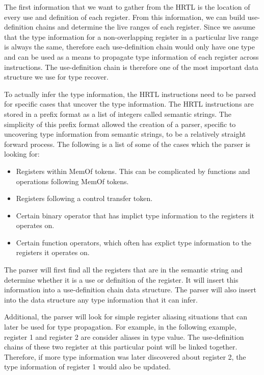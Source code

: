 The first information that we want to gather from the HRTL is the location
of every use and definition of each register. From this information, we
can build use-definition chains and determine the live ranges of each register.
Since we assume that the type information for a non-overlapping register in a 
particular live range is always the same, therefore each use-definition chain 
would only have one type and can be used as a means to propagate type 
information of each register across instructions. The use-definition chain 
is therefore one of the most important data structure we use for type recover.

To actually infer the type information, the HRTL instructions need to be parsed
for specific cases that uncover the type information. The HRTL instructions are 
stored in a prefix format as a list of integers called semantic strings. The 
simplicity of this prefix format allowed the creation of a parser, specific
to uncovering type information from semantic strings, to be a relatively 
straight forward process. The following is a list of some of the cases
which the parser is looking for:

\begin{itemize}
\item Registers within MemOf tokens. This can be complicated by functions
	and operations following MemOf tokens.
\item Registers following a control transfer token. 
\item Certain binary operator that has implict type information to the registers
	it operates on.
\item Certain function operators, which often has explict type information
	to the registers it operates on.
\end{itemize}

The parser will first find all the registers that are in the semantic string and
determine whether it is a use or definition of the register. It will insert
this information into a use-definition chain data structure. The parser will
also insert into the data structure any type information that it can infer.

Additional, the parser will look for simple register aliasing situations that 
can later be used for type propagation. For example, in the following example, 
register 1 and register 2 are consider aliases in type value. The 
use-definition chains of these two register at this particular point will be 
linked together. Therefore, if more type information was later discovered 
about register 2, the type information of register 1 would also be updated.

